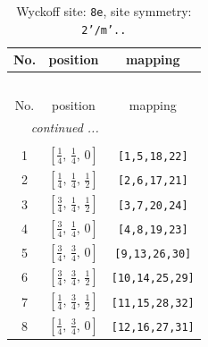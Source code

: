 \documentclass[fleqn,8pt]{jsarticle}
\begin{document}
\begin{longtable}{ccc}
\caption{Wyckoff site: {\tt 8e}, site symmetry: {\tt 2'/m'..}}
 \\
 \hline \hline
No. & position & mapping \\ \hline \endfirsthead

\multicolumn{2}{l}{\tablename\ \thetable{}} \\
 \hline \hline
No. & position & mapping \\ \hline \endhead

 \hline \hline
\multicolumn{2}{r}{\footnotesize\it continued ...} \\ \endfoot

 \hline \hline
\multicolumn{2}{r}{} \\ \endlastfoot

1 & $\left[ \frac{1}{4},\, \frac{1}{4},\, 0 \right]$ & {\tt [1,5,18,22]} \\ \hline
2 & $\left[ \frac{1}{4},\, \frac{1}{4},\, \frac{1}{2} \right]$ & {\tt [2,6,17,21]} \\ \hline
3 & $\left[ \frac{3}{4},\, \frac{1}{4},\, \frac{1}{2} \right]$ & {\tt [3,7,20,24]} \\ \hline
4 & $\left[ \frac{3}{4},\, \frac{1}{4},\, 0 \right]$ & {\tt [4,8,19,23]} \\ \hline
5 & $\left[ \frac{3}{4},\, \frac{3}{4},\, 0 \right]$ & {\tt [9,13,26,30]} \\ \hline
6 & $\left[ \frac{3}{4},\, \frac{3}{4},\, \frac{1}{2} \right]$ & {\tt [10,14,25,29]} \\ \hline
7 & $\left[ \frac{1}{4},\, \frac{3}{4},\, \frac{1}{2} \right]$ & {\tt [11,15,28,32]} \\ \hline
8 & $\left[ \frac{1}{4},\, \frac{3}{4},\, 0 \right]$ & {\tt [12,16,27,31]} \\
\end{longtable}
\renewcommand{\arraystretch}{1.2}
\end{document}
